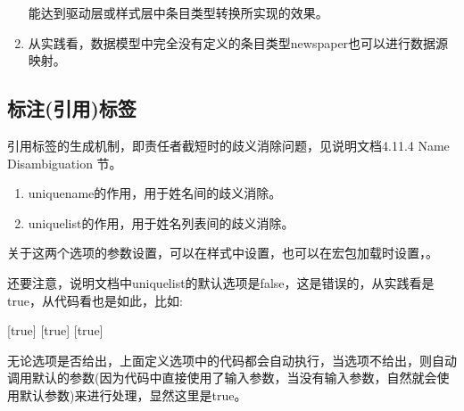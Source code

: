 \begin{enumerate}
            能达到驱动层或样式层中条目类型转换所实现的效果。
            \begin{texlist}
            \DeclareStyleSourcemap{
                \maps[datatype=bibtex]{
                    \map{%
                    \step[typesource=newspaper, typetarget=article, final]
                    }
                }
            }
            \end{texlist}

      \item 从实践看，数据模型中完全没有定义的条目类型newspaper也可以进行数据源映射。
  \end{enumerate}

\subsection{标注(引用)标签}
引用标签的生成机制，即责任者截短时的歧义消除问题，见说明文档4.11.4 Name Disambiguation 节。
  \begin{enumerate}
    \item uniquename的作用，用于姓名间的歧义消除。
    \item uniquelist的作用，用于姓名列表间的歧义消除。
  \end{enumerate}


关于这两个选项的参数设置，可以在样式中设置，也可以在宏包加载时设置，。

还要注意，说明文档中uniquelist的默认选项是false，这是错误的，从实践看是true，从代码看也是如此，比如:
\begin{texlist}
[true]{%
    {}
    {}}
[true]{%
    {}
    {}}
[true]{%
    {}
    {}}
\def\blx@opt@uniquelist@false{0}
\def\blx@opt@uniquelist@true{1}
\def\blx@opt@uniquelist@minyear{2}
\end{texlist}
无论选项是否给出，上面定义选项中的代码都会自动执行，当选项不给出，则自动调用默认的参数(因为代码中直接使用了输入参数，当没有输入参数，自然就会使用默认参数)来进行处理，显然这里是true。

